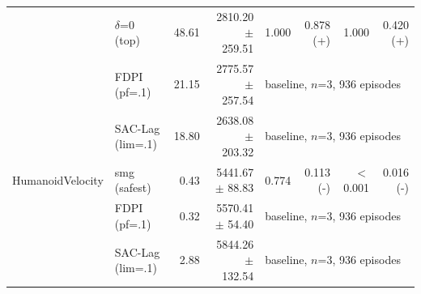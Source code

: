 \begin{tabular}{llrrrrrr}
 & $\delta$=0 (top) & 48.61 & 2810.20 $\pm$ 259.51 & 1.000 & 0.878 (+) & 1.000 & 0.420 (+) \\
 & FDPI (pf=.1) & 21.15 & 2775.57 $\pm$ 257.54 & \multicolumn{4}{l}{baseline, $n$=3, 936 episodes} \\
 & SAC-Lag (lim=.1) & 18.80 & 2638.08 $\pm$ 203.32 & \multicolumn{4}{l}{baseline, $n$=3, 936 episodes} \\
\midrule
HumanoidVelocity & smg (safest) & 0.43 & 5441.67 $\pm$ 88.83 & 0.774 & 0.113 (-) & $<$0.001 & 0.016 (-) \\
 & FDPI (pf=.1) & 0.32 & 5570.41 $\pm$ 54.40 & \multicolumn{4}{l}{baseline, $n$=3, 936 episodes} \\
 & SAC-Lag (lim=.1) & 2.88 & 5844.26 $\pm$ 132.54 & \multicolumn{4}{l}{baseline, $n$=3, 936 episodes} \\
\bottomrule
\end{tabular}
